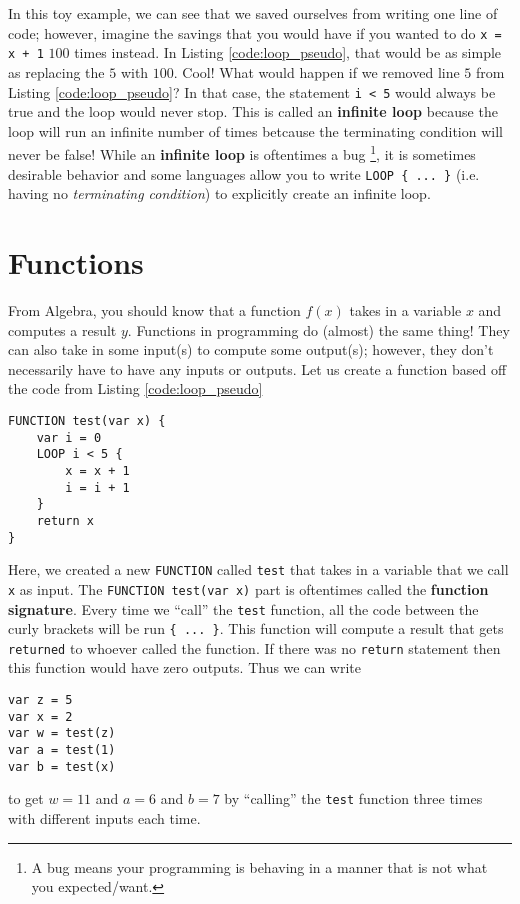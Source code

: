 \documentclass{article}
\begin{document}
In this toy example, we can see that we saved ourselves from writing one line of code; however, imagine the savings that you would have if you wanted to do \lstinline{x = x + 1} $100$ times instead.
In Listing \ref{code:loop_pseudo}, that would be as simple as replacing the $5$ with $100$.
Cool!
What would happen if we removed line $5$ from Listing \ref{code:loop_pseudo}?
In that case, the statement \lstinline{i < 5} would always be true and the loop would never stop.
This is called an \textbf{infinite loop} because the loop will run an infinite number of times betcause the terminating condition will never be false!
While an \textbf{infinite loop} is oftentimes a bug \footnote{A bug means your programming is behaving in a manner that is not what you expected/want.}, it is sometimes desirable behavior and some languages allow you to write \lstinline|LOOP { ... }| (i.e. having no \textit{terminating condition}) to explicitly create an infinite loop.

\section{Functions}

From Algebra, you should know that a function $f(x)$ takes in a variable $x$ and computes a result $y$.
Functions in programming do (almost) the same thing!
They can also take in some input(s) to compute some output(s); however, they don't necessarily have to have any inputs or outputs.
Let us create a function based off the code from Listing \ref{code:loop_pseudo}

\begin{lstlisting}[caption={Your first function.}, label={code:fn_pseudo}]
FUNCTION test(var x) {
    var i = 0
    LOOP i < 5 {
        x = x + 1
        i = i + 1
    }
    return x
}
\end{lstlisting}

Here, we created a new \lstinline{FUNCTION} called \lstinline{test} that takes in a variable that we call \lstinline{x} as input.
The \lstinline{FUNCTION test(var x)} part is oftentimes called the \textbf{function signature}.
Every time we ``call'' the \lstinline{test} function, all the code between the curly brackets will be run \lstinline|{ ... }|.
This function will compute a result that gets \lstinline{returned} to whoever called the function.
If there was no \lstinline{return} statement then this function would have zero outputs.
Thus we can write
\begin{lstlisting}[caption={Call test.}, label={code:call_fn_pseudo}]
var z = 5
var x = 2
var w = test(z)
var a = test(1)
var b = test(x)
\end{lstlisting}
to get $w = 11$ and $a = 6$ and $b = 7$ by ``calling'' the \lstinline{test} function three times with different inputs each time.
\end{document}
